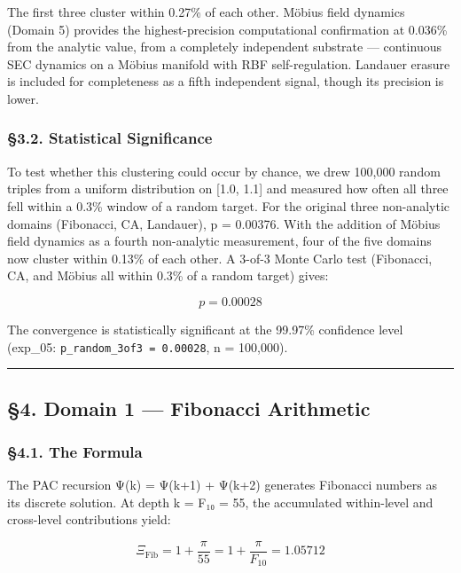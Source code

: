 \documentclass[
  11pt,
  a4paper]{article}
\begin{document}
The first three cluster within 0.27\% of each other. Möbius field
dynamics (Domain 5) provides the highest-precision computational
confirmation at 0.036\% from the analytic value, from a completely
independent substrate --- continuous SEC dynamics on a Möbius manifold
with RBF self-regulation. Landauer erasure is included for completeness
as a fifth independent signal, though its precision is lower.

\subsubsection{§3.2. Statistical
Significance}\label{statistical-significance}

To test whether this clustering could occur by chance, we drew 100,000
random triples from a uniform distribution on {[}1.0, 1.1{]} and
measured how often all three fell within a 0.3\% window of a random
target. For the original three non-analytic domains (Fibonacci, CA,
Landauer), p = 0.00376. With the addition of Möbius field dynamics as a
fourth non-analytic measurement, four of the five domains now cluster
within 0.13\% of each other. A 3-of-3 Monte Carlo test (Fibonacci, CA,
and Möbius all within 0.3\% of a random target) gives:

\[p = 0.00028\]

The convergence is statistically significant at the 99.97\% confidence
level (exp\_05: \texttt{p\_random\_3of3\ =\ 0.00028}, n = 100,000).

\begin{center}\rule{0.5\linewidth}{0.5pt}\end{center}

\subsection{§4. Domain 1 --- Fibonacci
Arithmetic}\label{domain-1-fibonacci-arithmetic}

\subsubsection{§4.1. The Formula}\label{the-formula}

The PAC recursion Ψ(k) = Ψ(k+1) + Ψ(k+2) generates Fibonacci numbers as
its discrete solution. At depth k = F₁₀ = 55, the accumulated
within-level and cross-level contributions yield:

\[\Xi_{\text{Fib}} = 1 + \frac{\pi}{55} = 1 + \frac{\pi}{F_{10}} = 1.05712\]
\end{document}
